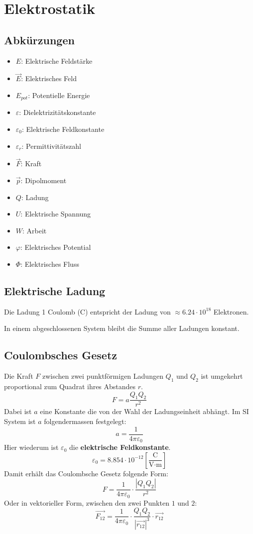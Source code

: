 \section{Elektrostatik}

\subsection{Abkürzungen}

\begin{itemize}
	\item $E$: Elektrische Feldstärke
	\item $\vec{E}$: Elektrisches Feld 
	\item $E_{pot}$: Potentielle Energie
	\item $\varepsilon$: Dielektrizitätskonstante
	\item $\varepsilon_0$: Elektrische Feldkonstante
	\item $\varepsilon_r$: Permittivitätszahl
	\item $\vec{F}$: Kraft
	\item $\vec{p}$: Dipolmoment
	\item $Q$: Ladung
	\item $U$: Elektrische Spannung
	\item $W$: Arbeit
	\item $\varphi$: Elektrisches Potential
	\item $\Phi$: Elektrisches Fluss
\end{itemize}

\subsection{Elektrische Ladung}

Die Ladung 1 Coulomb (C) entspricht der Ladung von $\approx 6.24 \cdot 10^{18}$
Elektronen.

In einem abgeschlossenen System bleibt die Summe aller Ladungen konstant.

\subsection{Coulombsches Gesetz}

Die Kraft $F$ zwischen zwei punktförmigen Ladungen $Q_1$ und $Q_2$ ist umgekehrt
proportional zum Quadrat ihres Abstandes $r$.
\[
	F = a \frac{Q_1Q_2}{r^2}
\]
Dabei ist $a$ eine Konstante die von der Wahl der Ladungseinheit abhängt. Im SI
System ist $a$ folgendermassen festgelegt:
\[
	a = \frac{1}{4 \pi \varepsilon_0}
\]
Hier wiederum ist $\varepsilon_0$ die \textbf{elektrische Feldkonstante}.
\[
	\varepsilon_0 = 8.854 \cdot 10^{-12}
	\left[ \frac{\textrm{C}}{\textrm{V}\cdot \textrm{m}} \right]
\]
Damit erhält das Coulombsche Gesetz folgende Form:
\[
	F = \frac{1}{4\pi\varepsilon_0} \cdot \frac{|Q_1Q_2|}{r^2}
\]
Oder in vektorieller Form, zwischen den zwei Punkten $1$ und $2$:
\[
	\vec{F_{12}} = \frac{1}{4\pi\varepsilon_0}
	\cdot \frac{Q_1Q_2}{|\vec{r_{12}}|^3}
	\cdot \vec{r_{12}}
\]

